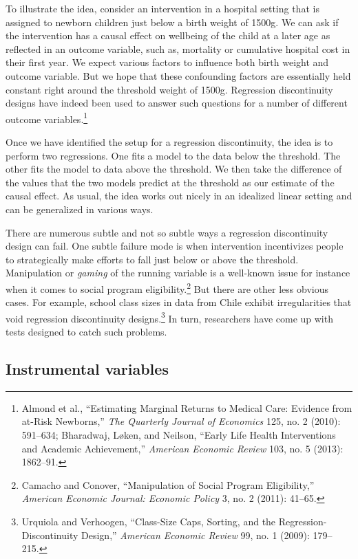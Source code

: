 \documentclass{tufte-book}
\begin{document}
To illustrate the idea, consider an intervention in a hospital setting
that is assigned to newborn children just below a birth weight of 1500g.
We can ask if the intervention has a causal effect on wellbeing of the
child at a later age as reflected in an outcome variable, such as,
mortality or cumulative hospital cost in their first year. We expect
various factors to influence both birth weight and outcome variable. But
we hope that these confounding factors are essentially held constant
right around the threshold weight of 1500g. Regression discontinuity
designs have indeed been used to answer such questions for a number of
different outcome variables.\footnote{Almond et al., {``Estimating
  Marginal Returns to Medical Care: Evidence from at-Risk Newborns,''}
  \emph{The Quarterly Journal of Economics} 125, no. 2 (2010): 591--634;
  Bharadwaj, Løken, and Neilson, {``Early Life Health Interventions and
  Academic Achievement,''} \emph{American Economic Review} 103, no. 5
  (2013): 1862--91.}

Once we have identified the setup for a regression discontinuity, the
idea is to perform two regressions. One fits a model to the data below
the threshold. The other fits the model to data above the threshold. We
then take the difference of the values that the two models predict at
the threshold as our estimate of the causal effect. As usual, the idea
works out nicely in an idealized linear setting and can be generalized
in various ways.

There are numerous subtle and not so subtle ways a regression
discontinuity design can fail. One subtle failure mode is when
intervention incentivizes people to strategically make efforts to fall
just below or above the threshold. Manipulation or \emph{gaming} of the
running variable is a well-known issue for instance when it comes to
social program eligibility.\footnote{Camacho and Conover,
  {``Manipulation of Social Program Eligibility,''} \emph{American
  Economic Journal: Economic Policy} 3, no. 2 (2011): 41--65.} But there
are other less obvious cases. For example, school class sizes in data
from Chile exhibit irregularities that void regression discontinuity
designs.\footnote{Urquiola and Verhoogen, {``Class-Size Caps, Sorting,
  and the Regression-Discontinuity Design,''} \emph{American Economic
  Review} 99, no. 1 (2009): 179--215.} In turn, researchers have come up
with tests designed to catch such problems.

\hypertarget{instrumental-variables}{%
\subsection{Instrumental variables}\label{instrumental-variables}}
\end{document}
